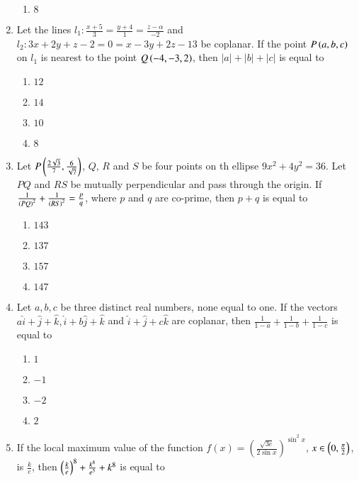\documentclass[journal,12pt,twocolumn]{IEEEtran}
\theoremstyle{remark}
\begin{document}
\begin{enumerate}
\begin{multicols}{2}
\begin{enumerate}
       \item $8$
\end{enumerate}
\end{multicols}
\bigskip
\item Let the lines $l_1: \frac{x+5}{3}=\frac{y+4}{1}=\frac{z-\alpha}{-2}$ and $l_2: 3x+2y+z-2=0=x-3y+2z-13$ be coplanar. If the point $P\left(a,b,c\right)$ on $l_1$ is nearest to the point $Q\left(-4,-3,2\right)$, then $|a|+|b|+|c|$ is equal to
\begin{multicols}{2}
\begin{enumerate}
       \item $12$
       \item $14$
       \item $10$
       \item $8$
\end{enumerate}
\end{multicols}
\bigskip
\item Let $P\left(\frac{2\sqrt{3}}{7},\frac{6}{\sqrt{7}}\right)$, $Q$, $R$ and $S$ be four points on th ellipse $9x^2+4y^2=36$. Let $PQ$ and $RS$ be mutually perpendicular and pass through the origin. If $\frac{1}{\left(PQ\right)^2}+\frac{1}{\left(RS\right)^2}=\frac{p}{q}$, where $p$ and $q$ are co-prime, then $p+q$ is equal to
\begin{multicols}{2}
\begin{enumerate}
    \item $143$
    \item $137$
    \item $157$
    \item $147$
\end{enumerate}
\end{multicols}
\bigskip
\item Let $a, b, c$ be three distinct real numbers, none equal to one. If the vectors $a\hat{i}+\hat{j}+\hat{k},\hat{i}+b\hat{j}+\hat{k}$ and $\hat{i}+\hat{j}+c\hat{k}$ are coplanar, then $\frac{1}{1-a}+\frac{1}{1-b}+\frac{1}{1-c}$ is equal to
\begin{multicols}{2}
\begin{enumerate}
    \item $1$
    \item $-1$
    \item $-2$
    \item $2$
\end{enumerate}
\end{multicols}
\bigskip
\item If the local maximum value of the function $f\left( x \right) = \left( \frac{\sqrt{3e}}{2 \sin{x}} \right)^{\sin^2{x}}$, $x\in \left(0,\frac{\pi}{2}\right)$, is $\frac{k}{e}$, then $\left(\frac{k}{e}\right)^8+\frac{k^8}{e^5}+k^8$ is equal to 

\end{enumerate}
\end{document}
